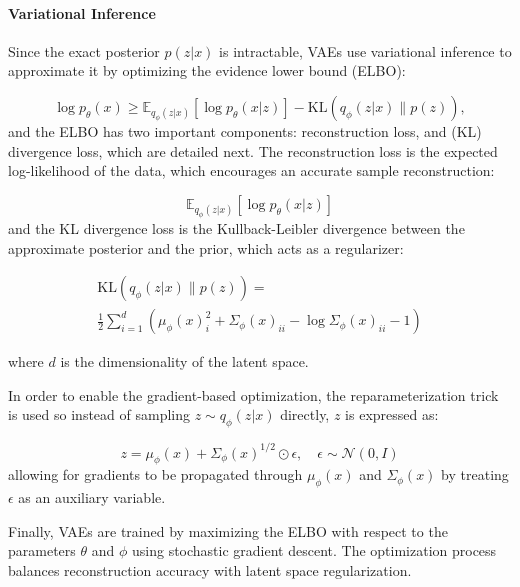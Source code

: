 \documentclass{ieeeaccess}
\begin{document}
\paragraph{Variational Inference} Since the exact posterior $p(z | x)$ is intractable, VAEs use variational inference to approximate it by optimizing the evidence lower bound (ELBO):

\begin{equation}
\log p_\theta(x) \geq \mathbb{E}_{q_\phi(z | x)} \left[ \log p_\theta(x | z) \right] - \text{KL}(q_\phi(z | x) \parallel p(z)),
\end{equation}
and the ELBO has two important components: reconstruction loss, and (KL) divergence loss, which are detailed next. The reconstruction loss is the expected log-likelihood of the data, which encourages an accurate sample reconstruction:

\begin{equation}
\mathbb{E}_{q_\phi(z | x)} \left[ \log p_\theta(x | z) \right]
\end{equation}
and the KL divergence loss is the Kullback-Leibler divergence between the approximate posterior and the prior, which acts as a regularizer:

\begin{equation}
\begin{aligned}
\text{KL}(q_\phi(z | x) \parallel p(z)) 
=  \\
\frac{1}{2} \sum_{i=1}^{d} \left( \mu_\phi(x)_i^2 + \Sigma_\phi(x)_{ii} - \log \Sigma_\phi(x)_{ii} - 1 \right)
\end{aligned}
\end{equation}

where $d$ is the dimensionality of the latent space.

In order to enable the gradient-based optimization, the reparameterization trick is used so instead of sampling $z \sim q_\phi(z | x)$ directly, $z$ is expressed as:

\begin{equation}
z = \mu_\phi(x) + \Sigma_\phi(x)^{1/2} \odot \epsilon, \quad \epsilon \sim \mathcal{N}(0, I)
\end{equation}
allowing for gradients to be propagated through $\mu_\phi(x)$ and $\Sigma_\phi(x)$ by treating $\epsilon$ as an auxiliary variable.

Finally, VAEs are trained by maximizing the ELBO with respect to the parameters $\theta$ and $\phi$ using stochastic gradient descent. The optimization process balances reconstruction accuracy with latent space regularization.
\end{document}

